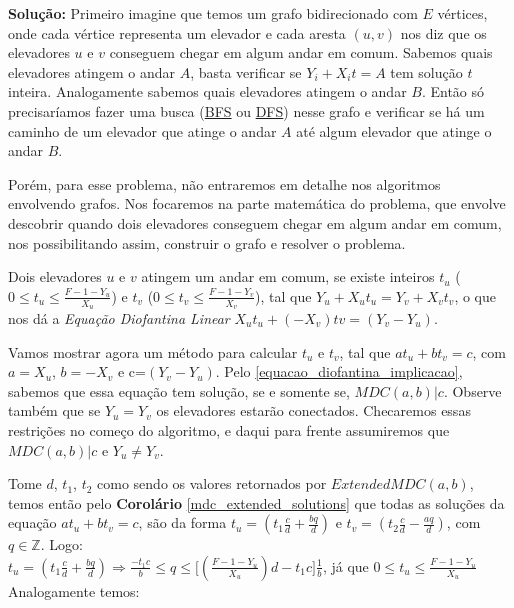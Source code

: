 \textbf{Solução:} 
Primeiro imagine que temos um grafo bidirecionado com $E$ vértices, onde cada vértice representa um elevador e cada aresta $(u,v)$ nos diz que os elevadores $u$ e $v$ 
conseguem chegar em algum andar em comum.
Sabemos quais elevadores atingem o andar $A$, basta verificar se $Y_i+X_it=A$ tem solução $t$ inteira. Analogamente sabemos quais elevadores atingem o andar
$B$. Então só precisaríamos fazer uma busca (\href{https://en.wikipedia.org/wiki/Breadth-first_search}{BFS} ou \href{https://en.wikipedia.org/wiki/Depth-first_search}{DFS})
nesse grafo e verificar se há um caminho de um elevador que atinge o andar $A$ até algum elevador que atinge o andar $B$.

Porém, para esse problema, não entraremos em detalhe nos algoritmos envolvendo grafos. Nos focaremos na parte matemática do problema, que envolve descobrir quando dois elevadores conseguem chegar em algum andar em comum, nos possibilitando assim, construir o grafo e resolver o problema.

Dois elevadores $u$ e $v$ atingem um andar em comum, se existe inteiros $t_u$ ($0\leq t_u\leq \frac{F-1-Y_u}{X_u}$) e $t_v$ ($0\leq t_v\leq \frac{F-1-Y_v}{X_v}$), tal que
$Y_u+X_ut_u = Y_v+X_vt_v$, o que nos dá a \textit{Equação Diofantina Linear} $X_ut_u + (-X_v)tv = (Y_v-Y_u)$.

Vamos mostrar agora um método para calcular $t_u$ e $t_v$, tal que $at_u + bt_v = c$, com $a=X_u$, $b=-X_v$ e c=$(Y_v-Y_u)$.
Pelo \autoref{equacao_diofantina_implicacao}, sabemos que essa equação tem solução, se e somente se, $MDC(a,b)|c$. Observe também que se $Y_u=Y_v$ os elevadores estarão conectados.
Checaremos essas restrições no começo do algoritmo, e daqui para frente assumiremos que $MDC(a,b)|c$ e $Y_u\neq Y_v$.

Tome $d$, $t_1$, $t_2$ como sendo os valores retornados por $ExtendedMDC(a,b)$, temos então pelo \textbf{Corolário} \autoref{mdc_extended_solutions} que todas as soluções da
equação $at_u + bt_v = c$, são da forma $t_u = (t_1\frac{c}{d} + \frac{bq}{d})$ e $t_v = (t_2\frac{c}{d} - \frac{aq}{d})$, com $q \in\mathbb{Z}$. Logo:
\\

$t_u = (t_1\frac{c}{d} + \frac{bq}{d}) \Rightarrow \frac{-t_1c}{b} \leq q \leq \big[(\frac{F-1-Y_u}{X_u})d - t_1c\big]\frac{1}{b}$, já que $0\leq t_u\leq \frac{F-1-Y_u}{X_u}$
\\

Analogamente temos:
\\

